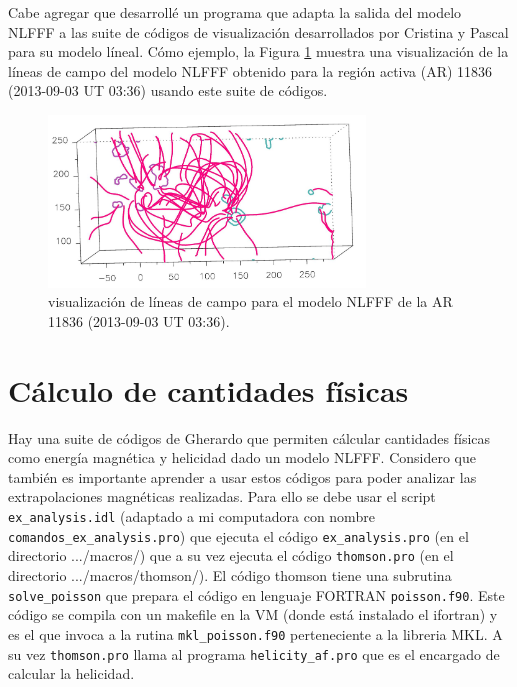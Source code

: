\documentclass[a4paper,10pt]{article}
\begin{document}
Cabe agregar que desarrollé un programa que adapta la salida del modelo NLFFF a las suite de códigos de visualización desarrollados por Cristina y Pascal para su modelo líneal. Cómo ejemplo, la Figura \ref{ej} muestra una visualización de la líneas de campo del modelo NLFFF obtenido para la región activa (AR) 11836 (2013-09-03 UT 03:36) usando este suite de códigos.

\begin{figure}
\begin{center}
\includegraphics[width=0.75\textwidth]{fig/nlfff_test.jpg}
\end{center}
\caption{visualización de líneas de campo para el modelo NLFFF de la AR 11836 (2013-09-03 UT 03:36).}
 \label{ej}
\end{figure}



\section{Cálculo de cantidades físicas}

Hay una suite de códigos de Gherardo que permiten cálcular cantidades físicas como energía magnética y helicidad dado un modelo NLFFF. Considero que también es importante aprender a usar estos códigos para poder analizar las extrapolaciones magnéticas realizadas. Para ello se debe usar el script {\tt ex\_analysis.idl} (adaptado a mi computadora con nombre {\tt comandos\_ex\_analysis.pro}) que ejecuta el código {\tt ex\_analysis.pro} (en el directorio .../macros/) que a su vez ejecuta el código {\tt thomson.pro} (en el directorio .../macros/thomson/). El código thomson tiene una subrutina {\tt solve\_poisson} que prepara el código en lenguaje FORTRAN {\tt poisson.f90}. Este código se compila con un makefile en la VM (donde está instalado el ifortran) y es el que invoca a la rutina {\tt mkl\_poisson.f90} perteneciente a la libreria MKL. A su vez {\tt thomson.pro} llama al programa {\tt helicity\_af.pro} que es el encargado de calcular la helicidad.
\end{document}
